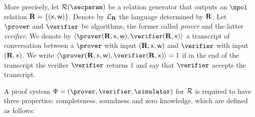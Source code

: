 \documentclass[runningheads,11pt]{llncs}
\theoremstyle{definition}
\begin{document}
More precisely, let $\RELGEN(\secparam)$ be a relation generator that outputs an $\npol$ relation $\mathbf{R} = \{(\mathsf{x}, \mathsf{w})\}$.  Denote by $\mathcal{L}_{\mathbf{R}}$ the language determined by $\mathbf{R}$.
Let $\prover$ and $\verifier$ be algorithms, the former called \emph{prover} and the latter \emph{verifier}.
We denote by $\ip{\prover(\REL, \inp, \wit)}{\verifier(\REL, \inp)}$ a transcript of conversation between a $\prover$ with input $(\mathbf{R}, \mathsf{x}, \mathsf{w})$ and $\verifier$ with input $(\mathbf{R}, \mathsf{x})$.
We write $\ip{\prover (\REL, \inp, \wit)}{\verifier(\REL, \inp)} = 1$ if in the end of the transcript the verifier $\verifier$ returns $1$ and say that $\verifier$ accepts the transcript.

A proof system $\proofsystem = (\prover, \verifier, \simulator)$ for $\mathcal{R}$ is required to have three properties: completeness, soundness and zero knowledge, which are defined as follows:
\end{document}
